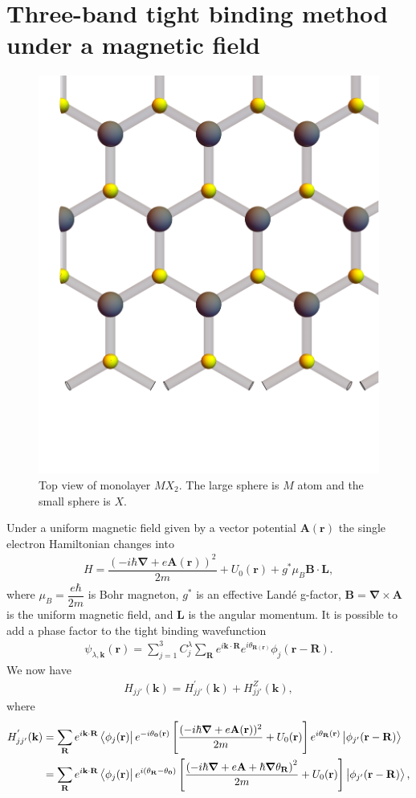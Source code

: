 \documentclass{report}
\newcommand{\f}[2]{\dfrac{#1}{#2}}
\begin{document}
\section{Three-band tight binding method under a magnetic field}
\begin{figure}[htb]
	\centering
	\includegraphics[width=0.5\linewidth,height=0.5\linewidth]{pic/lattice.pdf}
	\caption{\label{fig:Lattice} Top view of monolayer $MX_{2}$. The large sphere is $M$ atom and the small sphere is $X$.}
\end{figure}
Under a uniform magnetic field given by a vector potential $\mathbf{A}(\mathbf{r})$ the single electron Hamiltonian changes into
\begin{align}
	H = \f{\left(-i\hbar \boldsymbol{\nabla} + e \mathbf{A(r)}\right)^{2}}{2m} + U_{0}(\mathbf{r}) + g^{*} \mu_{B} \mathbf{B} \cdot \mathbf{L},
\end{align}
where $\mu_{B} = \f{e\hbar}{2m}$ is Bohr magneton, $g^{*}$ is an effective Landé g-factor, $\mathbf{B} = \boldsymbol{\nabla} \times  \mathbf{A}$ is the uniform magnetic field, and $\mathbf{L}$ is the angular momentum. It is possible to add a phase factor to the tight binding wavefunction
\begin{align}
	\psi_{\lambda,\mathbf{k}} (\mathbf{r}) = \sum_{j=1}^{3} C_{j}^{\lambda} \sum_{\mathbf{R}} e^{i\mathbf{k \cdot R}} e^{i \theta_{\mathbf{R}(\mathbf{r})}} \phi_{j}(\mathbf{r} - \mathbf{R}).
\end{align}
We now have
\begin{align}
	H_{j j'} (\mathbf{k}) = H_{jj'}^{'}(\mathbf{k}) + H_{jj'}^{Z}(\mathbf{k}),
\end{align}
where
\begin{align}
	H_{jj'}^{'}(\mathbf{k})
	& = \sum_{\mathbf{R}} e^{i\mathbf{k \cdot R}} \bra{\phi_{j}(\mathbf{r})} e^{-i \theta_{\mathbf{0}}(\mathbf{r})} \left[\f{(-i\hbar \boldsymbol{\nabla} + e \mathbf{A}(\mathbf{r}))^{2}}{2m} + U_{0}(\mathbf{r}) \right] e^{i \theta_{\mathbf{R}}(\mathbf{r})} \ket{\phi_{j'}(\mathbf{r - R})}\nonumber                  \\
	& = \sum_{\mathbf{R}} e^{i\mathbf{k \cdot R}} \bra{\phi_{j}(\mathbf{r})} e^{i(\theta_{\mathbf{R}} - \theta_{\mathbf{0}} )} \left[ \f{ \left( -i\hbar \boldsymbol{\nabla} + e \mathbf{A} + \hbar \boldsymbol{\nabla} \theta_{\mathbf{R}} \right)^{2} }{2m} + U_{0}(\mathbf{r}) \right] \ket{\phi_{j'}(\mathbf{r - R})},
\end{align}
\end{document}
